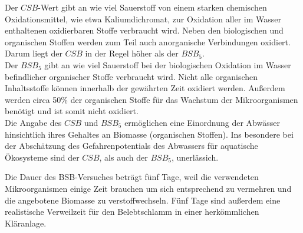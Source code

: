 


Der $CSB$-Wert gibt an wie viel Sauerstoff von einem  starken chemischen Oxidationsmittel, wie etwa Kaliumdichromat, zur Oxidation aller im Wasser enthaltenen oxidierbaren Stoffe verbraucht wird. Neben den biologischen und organischen Stoffen werden zum Teil auch anorganische Verbindungen oxidiert. Darum liegt der $CSB$ in der Regel höher als der $BSB_5$.\\
Der $BSB_5$ gibt an wie viel Sauerstoff bei der biologischen Oxidation im Wasser befindlicher organischer Stoffe verbraucht wird. Nicht alle organischen Inhaltsstoffe können innerhalb der gewährten Zeit oxidiert werden. Außerdem werden circa 50\% der organischen Stoffe für das Wachstum der Mikroorganismen benötigt und ist somit nicht oxidiert.\cite[S.64]{rosenwinkelAnaerobtechnikAbwasserSchlamm2015} \\
\newpage
Die Angabe des $CSB$ und $BSB_5$ ermöglichen eine Einordnung der Abwässer hinsichtlich ihres Gehaltes an Biomasse (organischen Stoffen). Ins besondere bei der Abschätzung des Gefahrenpotentials des Abwassers für aquatische Ökosysteme sind der $CSB$, als auch der $BSB_5$, unerlässich.

 
Die Dauer des BSB-Versuches beträgt fünf Tage, weil die verwendeten Mikroorganismen einige Zeit brauchen um sich entsprechend zu vermehren und die angebotene Biomasse zu verstoffwechseln. Fünf Tage sind außerdem eine realistische Verweilzeit für den Belebtschlamm in einer herkömmlichen Kläranlage.
\cite{KlaranlageROMPPThieme} \cite{SchlammalterROMPPThieme}

